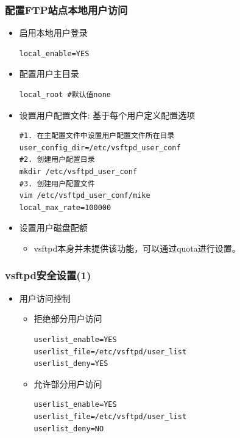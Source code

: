 \documentclass[xcolor=svgnames,presentation]{beamer}
\begin{document}
\begin{frame}[fragile]
\frametitle{配置FTP站点本地用户访问}
\label{sec-3-8}
\begin{itemize}

\item 启用本地用户登录\\
\label{sec-3-8-1}%
\begin{verbatim}
local_enable=YES
\end{verbatim}

\item 配置用户主目录\\
\label{sec-3-8-2}%
\begin{verbatim}
local_root #默认值none
\end{verbatim}

\item 设置用户配置文件: 基于每个用户定义配置选项\\
\label{sec-3-8-3}%
\begin{verbatim}
#1. 在主配置文件中设置用户配置文件所在目录
user_config_dir=/etc/vsftpd_user_conf
#2. 创建用户配置目录
mkdir /etc/vsftpd_user_conf
#3. 创建用户配置文件
vim /etc/vsftpd_user_conf/mike
local_max_rate=100000
\end{verbatim}

\item 设置用户磁盘配额
\label{sec-3-8-4}%
\begin{itemize}

\item vsftpd本身并未提供该功能，可以通过quota进行设置。
\label{sec-3-8-4-1}%
\end{itemize} %
\end{itemize} %
\end{frame}
\begin{frame}[fragile]
\frametitle{vsftpd安全设置(1)}
\label{sec-3-9}
\begin{itemize}

\item 用户访问控制
\label{sec-3-9-1}%
\begin{itemize}

\item 拒绝部分用户访问\\
\label{sec-3-9-1-1}%
\begin{verbatim}
userlist_enable=YES
userlist_file=/etc/vsftpd/user_list
userlist_deny=YES
\end{verbatim}

\item 允许部分用户访问\\
\label{sec-3-9-1-2}%
\begin{verbatim}
userlist_enable=YES
userlist_file=/etc/vsftpd/user_list
userlist_deny=NO
\end{verbatim}
\end{itemize} %
\end{itemize} %
\end{frame}
\end{document}
